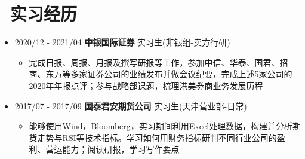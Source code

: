 \documentclass[11pt]{article}
\begin{document}
	
	
	
	\section{\makebox[\widthof{\faGraduationCap}][c]{\color{CVBlue}\faBriefcase}\ 实习经历}
	
	\begin{itemize}
		\item 2020/12 - 2021/04 \quad \quad \quad  \quad \quad \quad \textbf{中银国际证券} \quad \quad \quad  \quad \quad \quad 实习生(非银组-卖方行研) 
		\vspace{-5pt}
		\begin{itemize}
			\item 完成日报、周报、月报及撰写研报等工作，参加中信、华泰、国君、招商、东方等多家证券公司的业绩发布并做会议纪要，完成上述5家公司的2020年年报点评；参与战略部课题，梳理港美券商业务发展历程
		\end{itemize}
		\vspace{-5pt}
	\end{itemize}
	
	
	\begin{itemize}
		\item 2017/07 - 2017/09 \quad \quad \quad  \quad \quad \quad \textbf{国泰君安期货公司} \quad \quad \quad  \quad 实习生(天津营业部-日常)
		\vspace{-5pt}
		\begin{itemize}
			\item 能够使用Wind，Bloomberg，实习期间利用Excel处理数据，构建并分析期货走势与RSI等技术指标。学习如何用财务指标研判不同行业公司的盈利、营运能力；阅读研报，学习写作要点
		\end{itemize}
		\vspace{-5pt}
	\end{itemize}
	
	
	
\end{document}

